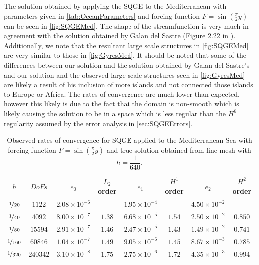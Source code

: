 The solution obtained by applying the SQGE to the Mediterranean with parameters
given in \autoref{tab:OceanParameters} and forcing function $F =
\sin(\frac{\pi}{2} y)$ can be seen in \autoref{fig:SQGEMed}. The shape of the
streamfunction is very much in agreement with the solution obtained by Galan del
Sastre (Figure 2.22 in \cite{Galan-del-Sastre2004}). Additionally,  we note that
the resultant large scale structures in \autoref{fig:SQGEMed} are very similar
to those in \autoref{fig:GyresMed}. It should be noted that some of the
differences between our solution and the solution obtained by Galan del Sastre's
and our solution and the observed large scale structures seen in
\autoref{fig:GyresMed} are likely a result of his inclusion of more islands and
not connected those islands to Europe or Africa. The rates of convergence are
much lower than expected, however this likely is due to the fact that the domain
is non-smooth which is likely causing the solution to be in a space which is
less regular than the $H^6$ regularity \cite{Soane2010} assumed by the error
analysis in \autoref{sec:SQGEErrors}.

\begin{table}
\begin{tabular}{|c|c|c|c|c|c|c|c|}%
  \hline
  $h$ & $DoFs$ & $e_0$ & $L_2$ order & $e_1$ & $H^1$ order & $e_2$ & $H^2$ order \\[0.2em]
  \hline
  $\nicefrac{1}{20}$ & $1122$ & $2.08\times 10^{-6}$ & $-$ & $1.95\times 10^{-4}$ & $-$ & $4.50\times 10^{-2}$ & $-$ \\
  $\nicefrac{1}{40}$ & $4092$ & $8.00\times 10^{-7}$ & $1.38$ & $6.68\times 10^{-5}$ & $1.54$ & $2.50\times 10^{-2}$ & $0.850$ \\
  $\nicefrac{1}{80}$ & $15594$ & $2.91\times 10^{-7}$ & $1.46$ & $2.47\times 10^{-5}$ & $1.43$ & $1.49\times 10^{-2}$ & $0.741$ \\
  $\nicefrac{1}{160}$ & $60846$ & $1.04\times 10^{-7}$ & $1.49$ & $9.05\times 10^{-6}$ & $1.45$ & $8.67\times 10^{-3}$ & $0.785$ \\
  $\nicefrac{1}{320}$ & $240342$ & $3.10\times 10^{-8}$ & $1.75$ & $2.75\times 10^{-6}$ & $1.72$ & $4.35\times 10^{-3}$ & $0.994$ \\
\hline
\end{tabular}
\caption{Observed rates of convergence for SQGE applied to the Mediterranean Sea
  with forcing function $F = \sin(\frac{\pi}{2} y)$ and true solution obtained
  from fine mesh with $h=\dfrac{1}{640}$.}
  \label{tab:SQGEMedConvergence}
\end{table}

